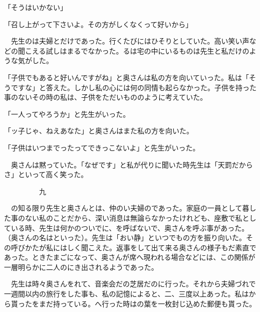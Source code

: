 \documentclass[a4j,onecolumn]{tarticle}
\begin{document}
「そうはいかない」\par{}
「召し上がって下さいよ。\hbox{}その方がしくなくって好いから」\par{}
　先生のは夫婦とだけであった。\hbox{}行くたびにはひそりとしていた。\hbox{}高い笑い声などの聞こえる試しはまるでなかった。\hbox{}るは宅の中にいるものは先生と私だけのような気がした。\hbox{}\par{}
「子供でもあると好いんですがね」と奥さんは私の方を向いていった。\hbox{}私は「そうですな」と答えた。\hbox{}しかし私の心には何の同情も起らなかった。\hbox{}子供を持った事のないその時の私は、\hbox{}子供をただいもののように考えていた。\hbox{}\par{}
「一人ってやろうか」と先生がいった。\hbox{}\par{}
「ッ子じゃ、\hbox{}ねえあなた」と奥さんはまた私の方を向いた。\hbox{}\par{}
「子供はいつまでったってできっこないよ」と先生がいった。\hbox{}\par{}
　奥さんは黙っていた。\hbox{}「なぜです」と私が代りに聞いた時先生は「天罰だからさ」といって高く笑った。\hbox{}\par{}\par{}　　　　　九
\par{}
　の知る限り先生と奥さんとは、\hbox{}仲のい夫婦のであった。\hbox{}家庭の一員として暮した事のない私のことだから、\hbox{}深い消息は無論らなかったけれども、\hbox{}座敷で私としている時、\hbox{}先生は何かのついでに、\hbox{}を呼ばないで、\hbox{}奥さんを呼ぶ事があった。\hbox{}（奥さんの名はといった）。\hbox{}先生は「おい静」といつでもの方を振り向いた。\hbox{}その呼びかたが私にはしく聞こえた。\hbox{}返事をして出て来る奥さんの様子もだ素直であった。\hbox{}ときたまごになって、\hbox{}奥さんが席へ現われる場合などには、\hbox{}この関係が一層明らかに二人のにき出されるようであった。\hbox{}\par{}
　先生は時々奥さんをれて、\hbox{}音楽会だの芝居だのに行った。\hbox{}それから夫婦づれで一週間以内の旅行をした事も、\hbox{}私の記憶によると、\hbox{}二、\hbox{}三度以上あった。\hbox{}私はから貰ったをまだ持っている。\hbox{}へ行った時はの葉を一枚封じ込めた郵便も貰った。\hbox{}\par{}
\end{document}
